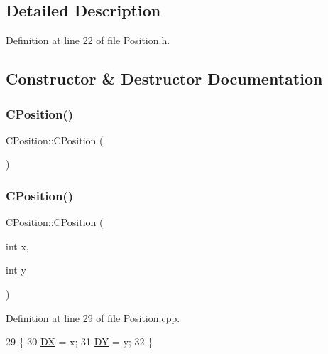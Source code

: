 \subsection{Detailed Description}


Definition at line 22 of file Position.\+h.



\subsection{Constructor \& Destructor Documentation}
\hypertarget{classCPosition_a0286273b62fb1419e0e358eb4c352458}{}\label{classCPosition_a0286273b62fb1419e0e358eb4c352458} 
\subsubsection{\texorpdfstring{C\+Position()}{CPosition()}\hspace{0.1cm}{\footnotesize\ttfamily [1/3]}}
{\footnotesize\ttfamily C\+Position\+::\+C\+Position (\begin{DoxyParamCaption}{ }\end{DoxyParamCaption})\hspace{0.3cm}{\ttfamily [default]}}

\hypertarget{classCPosition_a646b8a1a7c27e14a08becef2f61461df}{}\label{classCPosition_a646b8a1a7c27e14a08becef2f61461df} 
\subsubsection{\texorpdfstring{C\+Position()}{CPosition()}\hspace{0.1cm}{\footnotesize\ttfamily [2/3]}}
{\footnotesize\ttfamily C\+Position\+::\+C\+Position (\begin{DoxyParamCaption}\item[{int}]{x,  }\item[{int}]{y }\end{DoxyParamCaption})}



Definition at line 29 of file Position.\+cpp.


\begin{DoxyCode}
29                                 \{
30     \hyperlink{classCPosition_a28445f9b872169715919074d82044eda}{DX} = x;
31     \hyperlink{classCPosition_a84139c9e8eb547e7cf3cb851739943a4}{DY} = y;
32 \}
\end{DoxyCode}
\hypertarget{classCPosition_afb5f1cfc928945c49d3ce88c4ab19396}{}\label{classCPosition_afb5f1cfc928945c49d3ce88c4ab19396} 

